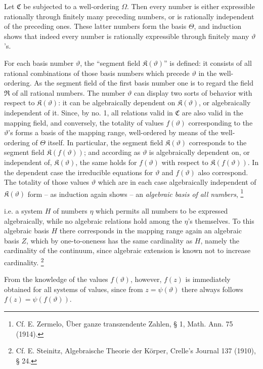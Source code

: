 \documentclass[11pt]{article}
\providecommand{\Cfield}{\mathfrak C}
\providecommand{\Kfield}{\mathfrak K}
\providecommand{\Rfield}{\mathfrak R}
\providecommand{\Kfield}{\mathfrak{K}}
\providecommand{\srcfn}[2]{%
  \begingroup
  \renewcommand{\thefootnote}{#1}%
  \footnote{#2}%
  \addtocounter{footnote}{-1}%
  \endgroup}
\begin{document}
Let \(\Cfield\) be subjected to a well-ordering \(\Omega\). Then every number is either expressible rationally through finitely many preceding numbers, or is rationally independent of the preceding ones. These latter numbers form the basis \(\Theta\), and induction shows that indeed every number is rationally expressible through finitely many \(\vartheta\)'s.

For each basis number \(\vartheta\), the ``segment field \(\Kfield(\vartheta)\)'' is defined: it consists of all rational combinations of those basis numbers which precede \(\vartheta\) in the well-ordering. As the segment field of the first basis number one is to regard the field \(\Rfield\) of all rational numbers. The number \(\vartheta\) can display two sorts of behavior with respect to \(\Kfield(\vartheta)\): it can be algebraically dependent on \(\Kfield(\vartheta)\), or algebraically independent of it. Since, by no. 1, all relations valid in \(\Cfield\) are also valid in the mapping field, and conversely, the totality of values \(f(\vartheta)\) corresponding to the \(\vartheta\)'s forms a basis of the mapping range, well-ordered by means of the well-ordering of \(\Theta\) itself. In particular, the segment field \(\Kfield(\vartheta)\) corresponds to the segment field \(\Kfield(f(\vartheta))\); and according as \(\vartheta\) is algebraically dependent on, or independent of, \(\Kfield(\vartheta)\), the same holds for \(f(\vartheta)\) with respect to \(\Kfield(f(\vartheta))\). In the dependent case the irreducible equations for \(\vartheta\) and \(f(\vartheta)\) also correspond. The totality of those values \(\vartheta\) which are in each case algebraically independent of \(\Kfield(\vartheta)\) form -- as induction again shows -- an \emph{algebraic basis of all numbers},\srcfn{*)}{Cf. E. Zermelo, Über ganze transzendente Zahlen, § 1, Math. Ann. 75 (1914).} i.e. a system \(H\) of numbers \(\eta\) which permits all numbers to be expressed algebraically, while no algebraic relations hold among the \(\eta\)'s themselves. To this algebraic basis \(H\) there corresponds in the mapping range again an algebraic basis \(Z\), which by one-to-oneness has the same cardinality as \(H\), namely the cardinality of the continuum, since algebraic extension is known not to increase cardinality.\srcfn{**)}{Cf. E. Steinitz, Algebraische Theorie der Körper, Crelle's Journal 137 (1910), § 24.} From the knowledge of the values \(f(\vartheta)\), however, \(f(z)\) is immediately obtained for all systems of values, since from \(z=\psi(\vartheta)\) there always follows \(f(z)=\psi(f(\vartheta))\).
\end{document}
